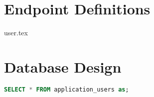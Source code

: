 \documentclass{article}
\begin{document}
\section{Endpoint Definitions}
{user.tex}


\section{Database Design}


\begin{lstlisting}[language=SQL, caption=Format XML for MAC calculation example]
SELECT * FROM application_users as;
\end{lstlisting}
\end{document}
